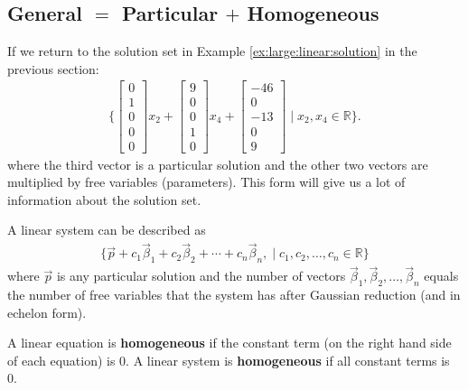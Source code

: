 \subsection{General $=$ Particular $+$ Homogeneous}  

If we return to the solution set in Example \ref{ex:large:linear:solution} in the previous section:
%
\begin{align*}
\{ \begin{bmatrix}
0 \\ 1 \\ 0 \\ 0 \\0
\end{bmatrix} x_2 + 
\begin{bmatrix}
9 \\ 0 \\ 0 \\ 1 \\ 0
\end{bmatrix} x_4 + 
\begin{bmatrix}
-46 \\ 0  \\ -13 \\ 0 \\ 9 
\end{bmatrix} \;  | \; x_2, x_4 \in \mathbb{R} \}.
\end{align*}
%
where the third vector is a particular solution and the other two vectors are multiplied by free variables (parameters).   This form will give us a lot of information about the solution set.  


\begin{theorem}
A linear system can be described as 
%
\begin{align*}
\{ \vec{p} + c_1 \vec{\beta}_1 + c_2 \vec{\beta}_2 + \cdots + c_n \vec{\beta}_n, \; | \; 	c_1, c_2, \ldots, c_n \in \mathbb{R} \} 
\end{align*}
where $\vec{p}$ is any particular solution and the number of vectors $\vec{\beta}_1, \vec{\beta}_2, \ldots, \vec{\beta}_n$ equals the number of free variables that the system has after Gaussian reduction (and in echelon form).  
\end{theorem}


\begin{definition}
A linear equation is \textbf{homogeneous} if the constant term (on the right hand side of each equation) is 0.  A linear system is \textbf{homogeneous} if all constant terms is 0.  
\end{definition}

